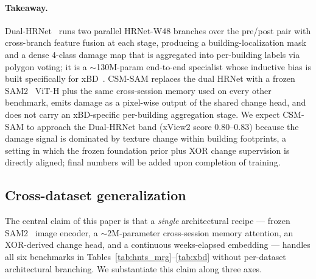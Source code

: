 \paragraph{Takeaway.} Dual-HRNet~\cite{koo2020dualhrnet} runs two
parallel HRNet-W48 branches over the pre/post pair with cross-branch
feature fusion at each stage, producing a building-localization mask
and a dense 4-class damage map that is aggregated into per-building
labels via polygon voting; it is a $\sim$130M-param end-to-end
specialist whose inductive bias is built specifically for
xBD~\cite{gupta2019xbd}. CSM-SAM replaces the dual HRNet with a
frozen SAM2~\cite{ravi2024sam2} ViT-H plus the same cross-session
memory used on every other benchmark, emits damage as a pixel-wise
output of the shared change head, and does not carry an xBD-specific
per-building aggregation stage. We expect CSM-SAM to approach the
Dual-HRNet band (xView2 score $0.80$--$0.83$) because the damage
signal is dominated by texture change within building footprints, a
setting in which the frozen foundation prior plus XOR change
supervision is directly aligned; final numbers will be added upon
completion of training.

\subsection{Cross-dataset generalization}
\label{sec:results_generalization}

The central claim of this paper is that a \emph{single} architectural
recipe --- frozen SAM2~\cite{ravi2024sam2} image encoder, a
$\sim$2M-parameter cross-session memory attention, an XOR-derived
change head, and a continuous weeks-elapsed embedding --- handles all
six benchmarks in Tables~\ref{tab:hnts_mrg}--\ref{tab:xbd} without
per-dataset architectural branching. We substantiate this claim along
three axes.

